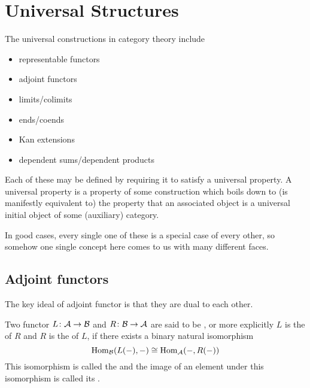 \chapter{Universal Structures}
The universal constructions in category theory include
\begin{itemize}
  \item representable functors
  \item adjoint functors
  \item limits/colimits
  \item ends/coends
  \item Kan extensions
  \item dependent sums/dependent products
\end{itemize}

Each of these may be defined by requiring it to satisfy a universal property. A universal property is a property of some construction which boils down to (is manifestly equivalent to) the property that an associated object is a universal initial object of some (auxiliary) category.

In good cases, every single one of these is a special case of every other, so somehow one single concept here comes to us with many different faces.

\minitoc
\newpage
\section{Adjoint functors}
The key ideal of adjoint functor is that they are dual to each other.
  \begin{defn}
    Two functor $L\colon{\cal A}\to{\cal B}$ and $R\colon{\cal B}\to{\cal A}$ are said to be , or more explicitly $L$ is the  of $R$ and $R$ is the  of $L$, if there exists a binary natural isomorphism
    \begin{equation*}
      \operatorname{Hom}_{{\cal B}}(L(-),-)\cong\operatorname{Hom}_{{\cal A}}(-,R(-))
    \end{equation*}
    This isomorphism is called the  and the image of an element under this isomorphism is called its .
  \end{defn}

